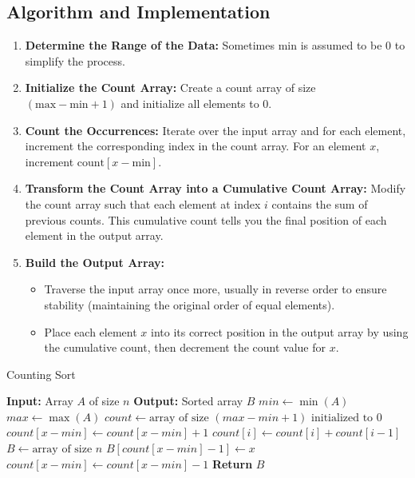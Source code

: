 \subsection{Algorithm and Implementation}
\begin{enumerate}
    \item \textbf{Determine the Range of the Data:} Sometimes min is assumed to be 0 to simplify the process.
    \item \textbf{Initialize the Count Array:} Create a count array of size \((\text{max} - \text{min} + 1)\) and initialize all elements to 0.
    \item \textbf{Count the Occurrences:} Iterate over the input array and for each element, increment the corresponding index in the count array. For an element \(x\), increment \(\text{count}[x - \text{min}]\).
    \item \textbf{Transform the Count Array into a Cumulative Count Array:} Modify the count array such that each element at index \(i\) contains the sum of previous counts. This cumulative count tells you the final position of each element in the output array.
    \item \textbf{Build the Output Array:}
    \begin{itemize}
        \item Traverse the input array once more, usually in reverse order to ensure stability (maintaining the original order of equal elements).
        \item Place each element \(x\) into its correct position in the output array by using the cumulative count, then decrement the count value for \(x\).
    \end{itemize}
\end{enumerate}

\begin{algorithm}
\caption{Counting Sort}
\begin{algorithmic}[1]
    \State \textbf{Input:} Array $A$ of size $n$
    \State \textbf{Output:} Sorted array $B$
        \State $min \gets \min(A)$
        \State $max \gets \max(A)$
        \State $count \gets \text{array of size } (max - min + 1) \text{ initialized to 0}$
            \State $count[x - min] \gets count[x - min] + 1$
        \EndFor
            \State $count[i] \gets count[i] + count[i - 1]$
        \EndFor
        \State $B \gets \text{array of size } n$
            \State $B[count[x - min] - 1] \gets x$
            \State $count[x - min] \gets count[x - min] - 1$
        \EndFor
        \State \textbf{Return} $B$
    \EndFunction
\end{algorithmic}
\end{algorithm}

